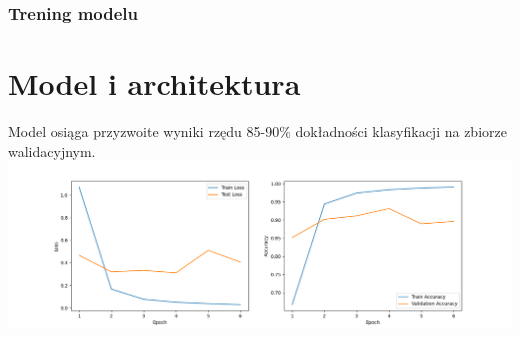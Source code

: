 \documentclass{beamer}
\begin{document}
	\begin{frame}
		\frametitle{Trening modelu}
		\section{Model i architektura}
		Model osiąga przyzwoite wyniki rzędu 85-90\% dokładności klasyfikacji na zbiorze walidacyjnym.
		\includegraphics[scale=0.23]{myplot}
	\end{frame}
\end{document}
